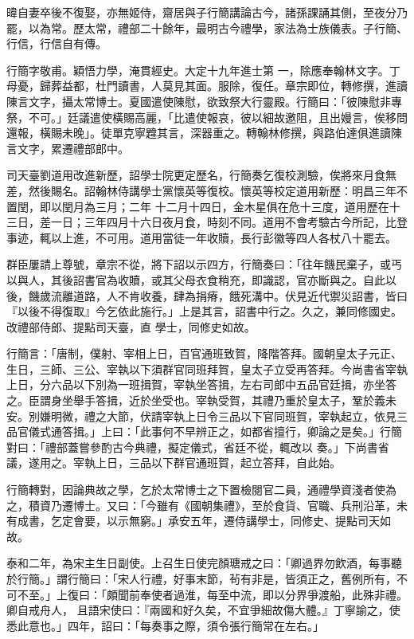 \begin{pinyinscope}
 暐自妻卒後不復娶，亦無姬侍，齋居與子行簡講論古今，諸孫課誦其側，至夜分乃罷，以為常。歷太常，禮部二十餘年，最明古今禮學，家法為士族儀表。子行簡、行信，行信自有傳。



 行簡字敬甫。穎悟力學，淹貫經史。大定十九年進士第
 一，除應奉翰林文字。丁母憂，歸葬益都，杜門讀書，人莫見其面。服除，復任。章宗即位，轉修撰，進讀陳言文字，攝太常博士。夏國遣使陳慰，欲致祭大行靈殿。行簡曰：「彼陳慰非專祭，不可。」廷議遣使橫賜高麗，「比遣使報哀，彼以細故邀阻，且出嫚言，俟移問還報，橫賜未晚」。徒單克寧韙其言，深器重之。轉翰林修撰，與路伯達俱進讀陳言文字，累遷禮部郎中。



 司天臺劉道用改進新歷，詔學士院更定歷名，行簡奏乞復校測驗，俟將來月食無差，然後賜名。詔翰林侍講學士黨懷英等復校。懷英等校定道用新歷：明昌三年不置閏，即以閏月為三月；二年
 十二月十四日，金木星俱在危十三度，道用歷在十三日，差一日；三年四月十六日夜月食，時刻不同。道用不會考驗古今所記，比登事迹，輒以上進，不可用。道用當徒一年收贖，長行彭徽等四人各杖八十罷去。



 群臣屢請上尊號，章宗不從，將下詔以示四方，行簡奏曰：「往年饑民棄子，或丐以與人，其後詔書官為收贖，或其父母衣食稍充，即識認，官亦斷與之。自此以後，饑歲流離道路，人不肯收養，肆為捐瘠，餓死溝中。伏見近代禦災詔書，皆曰『以後不得復取』今乞依此施行。」上是其言，詔書中行之。久之，兼同修國史。改禮部侍郎、提點司天臺，直
 學士，同修史如故。



 行簡言：「唐制，僕射、宰相上日，百官通班致賀，降階答拜。國朝皇太子元正、生日，三師、三公、宰執以下須群官同班拜賀，皇太子立受再答拜。今尚書省宰執上日，分六品以下別為一班揖賀，宰執坐答揖，左右司郎中五品官廷揖，亦坐答之。臣謂身坐舉手答揖，近於坐受也。宰執受賀，其禮乃重於皇太子，鞏於義未安。別嫌明微，禮之大節，伏請宰執上日令三品以下官同班賀，宰執起立，依見三品官儀式通答揖。」上曰：「此事何不早辨正之，如都省擅行，卿論之是矣。」行簡對曰：「禮部蓋嘗參酌古今典禮，擬定儀式，省廷不從，輒改以
 奏。」下尚書省議，遂用之。宰執上日，三品以下群官通班賀，起立答拜，自此始。



 行簡轉對，因論典故之學，乞於太常博士之下置檢閱官二員，通禮學資淺者使為之，積資乃遷博士。又曰：「今雖有《國朝集禮》，至於食貨、官職、兵刑沿革，未有成書，乞定會要，以示無窮。」承安五年，遷侍講學士，同修史、提點司天如故。



 泰和二年，為宋主生日副使。上召生日使完顏瑭戒之曰：「卿過界勿飲酒，每事聽於行簡。」謂行簡曰：「宋人行禮，好事末節，茍有非是，皆須正之，舊例所有，不可不至。」上復曰：「頗聞前奉使者過淮，每至中流，即以分界爭渡船，此殊非禮。卿自戒舟人，
 且語宋使曰：『兩國和好久矣，不宜爭細故傷大體。』丁寧諭之，使悉此意也。」四年，詔曰：「每奏事之際，須令張行簡常在左右。」




\end{pinyinscope}
